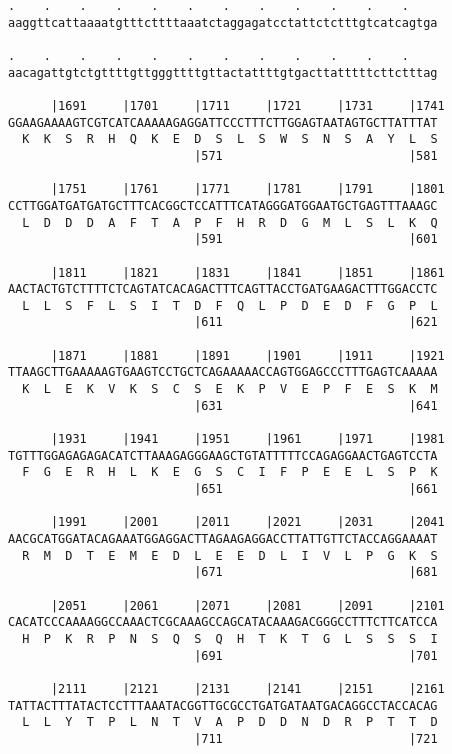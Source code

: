 \documentclass{article}
\begin{document}
\begin{Verbatim}
.    .    .    .    .    .    .    .    .    .    .    .    
aaggttcattaaaatgtttcttttaaatctaggagatcctattctctttgtcatcagtga
                                                            
.    .    .    .    .    .    .    .    .    .    .    .    
aacagattgtctgttttgttgggttttgttactattttgtgacttatttttcttctttag
                                                            
      |1691     |1701     |1711     |1721     |1731     |1741
GGAAGAAAAGTCGTCATCAAAAAGAGGATTCCCTTTCTTGGAGTAATAGTGCTTATTTAT
  K  K  S  R  H  Q  K  E  D  S  L  S  W  S  N  S  A  Y  L  S
                          |571                          |581
  
      |1751     |1761     |1771     |1781     |1791     |1801
CCTTGGATGATGATGCTTTCACGGCTCCATTTCATAGGGATGGAATGCTGAGTTTAAAGC
  L  D  D  D  A  F  T  A  P  F  H  R  D  G  M  L  S  L  K  Q
                          |591                          |601
  
      |1811     |1821     |1831     |1841     |1851     |1861
AACTACTGTCTTTTCTCAGTATCACAGACTTTCAGTTACCTGATGAAGACTTTGGACCTC
  L  L  S  F  L  S  I  T  D  F  Q  L  P  D  E  D  F  G  P  L
                          |611                          |621
  
      |1871     |1881     |1891     |1901     |1911     |1921
TTAAGCTTGAAAAAGTGAAGTCCTGCTCAGAAAAACCAGTGGAGCCCTTTGAGTCAAAAA
  K  L  E  K  V  K  S  C  S  E  K  P  V  E  P  F  E  S  K  M
                          |631                          |641
  
      |1931     |1941     |1951     |1961     |1971     |1981
TGTTTGGAGAGAGACATCTTAAAGAGGGAAGCTGTATTTTTCCAGAGGAACTGAGTCCTA
  F  G  E  R  H  L  K  E  G  S  C  I  F  P  E  E  L  S  P  K
                          |651                          |661
  
      |1991     |2001     |2011     |2021     |2031     |2041
AACGCATGGATACAGAAATGGAGGACTTAGAAGAGGACCTTATTGTTCTACCAGGAAAAT
  R  M  D  T  E  M  E  D  L  E  E  D  L  I  V  L  P  G  K  S
                          |671                          |681
  
      |2051     |2061     |2071     |2081     |2091     |2101
CACATCCCAAAAGGCCAAACTCGCAAAGCCAGCATACAAAGACGGGCCTTTCTTCATCCA
  H  P  K  R  P  N  S  Q  S  Q  H  T  K  T  G  L  S  S  S  I
                          |691                          |701
  
      |2111     |2121     |2131     |2141     |2151     |2161
TATTACTTTATACTCCTTTAAATACGGTTGCGCCTGATGATAATGACAGGCCTACCACAG
  L  L  Y  T  P  L  N  T  V  A  P  D  D  N  D  R  P  T  T  D
                          |711                          |721
  

\end{Verbatim}
\end{document}
